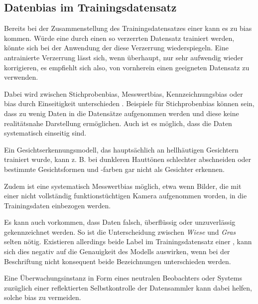 \documentclass[hidelinks,12pt]{report}
\begin{document}
\subsection{Daten\gls{bias} im Trainingsdatensatz}
Bereits bei der Zusammenstellung des Trainingsdatensatzes einer  kann es zu \Gls{bias}  kommen. Würde eine  durch einen so verzerrten Datensatz trainiert werden, könnte sich bei der Anwendung der  diese Verzerrung wiederspiegeln. Eine antrainierte Verzerrung lässt sich, wenn überhaupt, nur sehr aufwendig wieder korrigieren, es empfiehlt sich also, von vornherein einen geeigneten Datensatz zu verwenden.

Dabei wird zwischen Stichproben\gls{bias}, Messwert\gls{bias}, Kennzeichnungs\gls{bias} oder \gls{bias} durch Einseitigkeit unterschieden \cite[S. 48ff.]{Srinivasan}.
Beispiele für Stichproben\gls{bias} können sein, dass zu wenig Daten in die Datensätze aufgenommen werden und diese keine realitätsnahe Darstellung ermöglichen.
Auch ist es möglich, dass die Daten systematisch einseitig sind. 

Ein Gesichtserkennungsmodell, das hauptsächlich an hellhäutigen Gesichtern trainiert wurde, kann z. B. bei dunkleren Hauttönen schlechter abschneiden oder bestimmte Gesichtsformen und -farben gar nicht als Gesichter erkennen.

Zudem ist eine systematisch Messwert\gls{bias} möglich, etwa wenn Bilder, die mit einer nicht vollständig funktionstüchtigen Kamera aufgenommen worden, in die Trainingsdaten einbezogen werden.

Es kann auch vorkommen, dass Daten falsch, überflüssig oder unzuverlässig gekennzeichnet werden. So ist die Unterscheidung zwischen \textit{Wiese} und \textit{Gras} selten nötig. Existieren allerdings beide Label im Trainingsdatensatz einer , kann sich dies negativ auf die Genauigkeit des Modells auswirken, wenn bei der Beschriftung nicht konsequent beide Bezeichnungen unterschieden werden\cite[S. 48ff.]{Srinivasan}. 

Eine Überwachungsinstanz in Form eines neutralen Beobachters oder Systems zuzüglich einer reflektierten Selbstkontrolle der Datensammler kann dabei helfen, solche \Gls{bias}  zu vermeiden.\\
\end{document}
